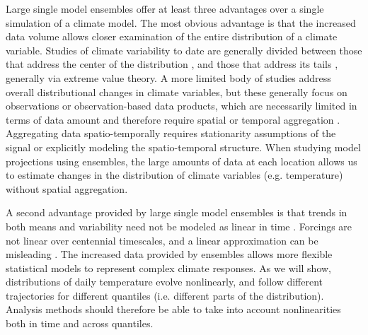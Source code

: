 \documentclass{ametsoc}
\begin{document}
Large single model ensembles offer at least three advantages over a single simulation of a climate model. The most obvious advantage is that the increased data volume allows closer examination of the entire distribution of a climate variable.
 Studies of climate variability to date are generally divided between those that address the center of the distribution 
\citep[e.g.][]{semenov2002secular,raisanen2002co2, kitoh2009changes, screen2014arctic, schneider2015physics}, and those that address its tails \citep[e.g.][]{katz1992extreme, meehl2009relative, northrop2011threshold, davison2012statistical, huser2014space, trenberth2015attribution, huang2015estimating, jalbert2017spatiotemporal}, generally via extreme value theory. %
A more limited body of studies address overall distributional changes in climate variables, but these generally focus on observations or observation-based data products, which are necessarily limited in terms of data amount and therefore require spatial or temporal aggregation \citep{donat2012shifting, stainforth2013mapping, chapman2013estimating, huybers2014us, mckinnon2016changing, rhines2017seasonally}. Aggregating data spatio-temporally requires stationarity assumptions of the signal or explicitly modeling the spatio-temporal structure. When studying model projections using ensembles, the large amounts of data at each location allows us to estimate changes in the distribution of climate variables (e.g. temperature) without spatial aggregation.

A second advantage provided by large single model ensembles is that trends in both means and variability need not be modeled as linear in time \citep{franzke2015local,gao2017quantile}. Forcings are not linear over centennial timescales, and a linear approximation can be misleading \citep[see for example][]{poppick2017estimating}. The increased data provided by ensembles allows more flexible statistical models to represent complex climate responses. %
As we will show, distributions of daily temperature evolve nonlinearly, and follow different trajectories for different quantiles (i.e. different parts of the distribution). %
Analysis methods should therefore be able to take into account nonlinearities both in time and across quantiles. 
\end{document}
